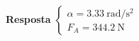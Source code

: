 \textbf{Resposta}
$
\begin{cases}
	\alpha=\SI{3.33}{\radian/\second^{2}}\\
	F_{A}=\SI{344.2}{\newton}
\end{cases}
$